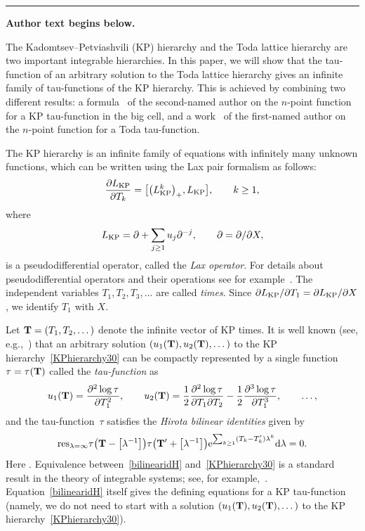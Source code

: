 \documentclass[11pt]{article}
\numberwithin{equation}{section}
\newcommand{\p}{\partial}
\newcommand{\beq}{\begin{equation}}
\newcommand{\eeq}{\end{equation}}
\numberwithin{equation}{section}
\begin{document}
\medskip\hrule\medskip\noindent\textbf{Author text begins below.}\par
\setcounter{section}{1}
The Kadomtsev--Petviashvili (KP) hierarchy and
the Toda lattice hierarchy are two important integrable hierarchies. In this
paper, we will show that the tau-function of an arbitrary solution to the Toda lattice hierarchy
gives an infinite family of tau-functions of the KP hierarchy.
This is achieved by combining two different results:
a formula~\cite{Zhou-Emergent} of the second-named author on the $n$-point function for a KP tau-function in the big cell,
and a work~\cite{Y} of the first-named author on the $n$-point function for a Toda tau-function.

The KP hierarchy is an infinite family of equations with infinitely many unknown functions,
which can be written using the Lax pair formalism as follows:
\beq\label{KPhierarchy30}
\frac{\p L_{\rm KP}}{\p T_k} = \bigl[\bigl(L_{\rm KP}^k\bigr)_+, L_{\rm KP}\bigr], \qquad k\ge1,
\eeq
where
\[
L_{\rm KP} = \p + \sum_{j\ge1} u_j \p^{-j}, \qquad \p=\p/\p X,
\]
is a pseudodifferential operator, called the {\it Lax operator}.
For details about pseudodifferential operators and their operations see for example~\cite{Dickey}.
The independent variables $T_1,T_2,T_3,\dots$ are called {\it times}.
Since $\p L_{\rm KP}/\p T_1 = \p L_{\rm KP}/\p X$, we identify $T_1$ with $X$.

Let ${\bf T}=(T_1,T_2,\dots)$ denote the infinite vector of KP times.
It is well known (see, e.g.,~\cite{Dickey}) that an arbitrary solution $(u_1({\bf T}), u_2({\bf T}),\dots)$
to the KP hierarchy~\eqref{KPhierarchy30} can be compactly represented by a single function $\tau=\tau({\bf T})$
called the {\it tau-function} as
\[
u_1({\bf T}) = \frac{\p^2 \log \tau}{\p T_1^2}, \qquad u_2({\bf T}) = \frac12 \frac{\p^2 \log \tau}{\p T_1 \p T_2} - \frac12 \frac{\p^3 \log \tau}{\p T_1^3}, \qquad \dots,
\]
and the tau-function~$\tau$ satisfies the {\it Hirota bilinear identities} given by
\beq\label{bilinearidH}
{\rm res}_{\lambda=\infty} \tau\bigl({\bf T} - \bigl[\lambda^{-1}\bigr]\bigr) \tau\bigl({\bf T'} + \bigl[\lambda^{-1}\bigr]\bigr) {\rm e}^{\sum_{k\ge1} (T_k-T_k') \lambda^k} {\rm d}\lambda=0.
\eeq
Here .
Equivalence between~\eqref{bilinearidH} and~\eqref{KPhierarchy30} is a standard result in the theory of integrable systems; see, for example,~\cite{Dickey}.
Equation~\eqref{bilinearidH} itself gives the defining equations for a KP tau-function (namely, we do not
 need to start with a solution $(u_1({\bf T}), u_2({\bf T}),\dots)$ to the KP hierarchy~\eqref{KPhierarchy30}).
\end{document}
